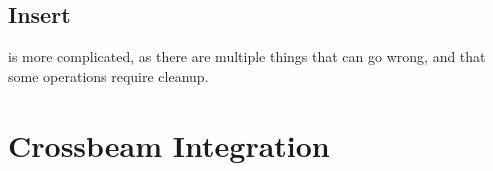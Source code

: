 \begin{figure}[ht]

\end{figure}


\subsection{Insert}

 is more complicated, as there are multiple things that can go wrong, and
that some operations require cleanup. 


\begin{figure}[ht]

\end{figure}





\section{Crossbeam Integration}
\blindtext{}
